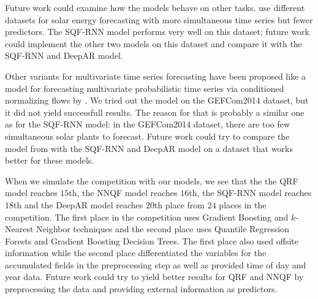 Future work could examine how the models behave on other tasks. 
\Textcite{Gasthaus2019} use different datasets for solar energy forecasting with more 
simultaneous time series but fewer predictors. 
The SQF-RNN model performs very well on this dataset; future work could implement the other two models 
on this dataset and compare it with the SQF-RNN and DeepAR model.

Other variants for multivariate time series forecasting have been proposed like a model 
for forecasting multivariate probabilistic time series via conditioned normalizing flows 
by \Textcite{Rasul2020}. We tried out the model on the GEFCom2014 dataset, but it did not yield 
successfull results. The reason for that is probably a similar one as for the SQF-RNN model: 
in the GEFCom2014 dataset, there are too few simultaneous solar plants to forecast. 
Future work could try to compare the model from \Textcite{Rasul2020} with the SQF-RNN and DeepAR model 
on a dataset that works better for these models. 

When we simulate the competition with our models, we see that 
the the QRF model reaches \(15\)th, 
the NNQF model reaches \(16\)th, the SQF-RNN model reaches \(18\)th 
and the DeepAR model reaches \(20\)th place from \(24\) places in the competition. 
The first place in the competition uses Gradient Boosting and \(k\)-Nearest Neighbor techniques 
and the second place uses Quantile Regression Forests and Gradient Boosting Decision Trees. 
The first place also used offsite information while the second place differentiated the variables 
for the accumulated fields in the preprocessing step as well as provided time of day and year data. 
Future work could try to yield better results for QRF and NNQF by preprocessing the data and providing 
external information as predictors. 